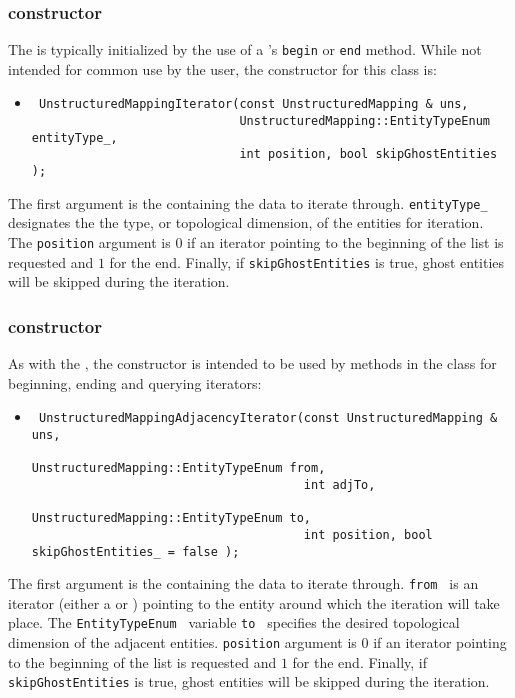 \subsubsection{\umapI constructor}
The \umapI is typically initialized by the use of a \umap's {\tt begin} or {\tt end}
method.  While not intended for common use by the user, the constructor for this class 
is:
\begin{itemize}
\item \begin{verbatim} 
 UnstructuredMappingIterator(const UnstructuredMapping & uns, 
                             UnstructuredMapping::EntityTypeEnum entityType_,
                             int position, bool skipGhostEntities ); \end{verbatim}
\end{itemize}
The first argument is the \umap containing the data to iterate through.  {\tt entityType\_ } designates the the type, or
topological dimension, of the entities for iteration.  The {\tt position} argument is $0$ if an iterator pointing to
the beginning of the list is requested and $1$ for the end.  Finally, if {\tt skipGhostEntities} is true, ghost entities
will be skipped during the iteration.
\subsubsection{\umapAI constructor}
As with the \umapI, the \umapAI constructor is intended to be used by
methods in the \umap class for beginning, ending and querying
iterators:
\begin{itemize}
\item \begin{verbatim} 
 UnstructuredMappingAdjacencyIterator(const UnstructuredMapping & uns, 
                                      UnstructuredMapping::EntityTypeEnum from, 
                                      int adjTo, 
                                      UnstructuredMapping::EntityTypeEnum to,
                                      int position, bool skipGhostEntities_ = false ); \end{verbatim}
\end{itemize}
The first argument is the \umap containing the data to iterate
through.  {\tt from } is an iterator (either a \umapI or \umapAI )
pointing to the entity around which the iteration will take place.
The {\tt EntityTypeEnum } variable {\tt to } specifies the desired
topological dimension of the adjacent entities.  {\tt position}
argument is $0$ if an iterator pointing to the beginning of the list
is requested and $1$ for the end.  Finally, if {\tt skipGhostEntities}
is true, ghost entities will be skipped during the iteration.

